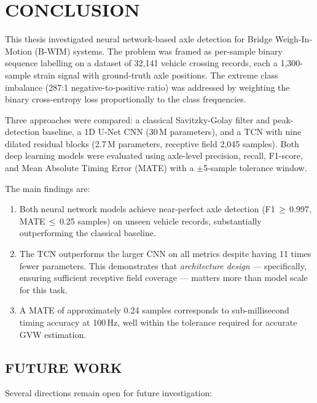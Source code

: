 \chapter{CONCLUSION}

This thesis investigated neural network-based axle detection for Bridge
Weigh-In-Motion (B-WIM) systems. The problem was framed as per-sample binary
sequence labelling on a dataset of 32,141 vehicle crossing records, each a
1,300-sample strain signal with ground-truth axle positions. The extreme class
imbalance (287:1 negative-to-positive ratio) was addressed by weighting the
binary cross-entropy loss proportionally to the class frequencies.

Three approaches were compared: a classical Savitzky-Golay filter and
peak-detection baseline, a 1D U-Net CNN (30\,M parameters), and a TCN with nine
dilated residual blocks (2.7\,M parameters, receptive field 2,045 samples). Both
deep learning models were evaluated using axle-level precision, recall, F1-score,
and Mean Absolute Timing Error (MATE) with a $\pm$5-sample tolerance window.

The main findings are:

\begin{enumerate}
    \item Both neural network models achieve near-perfect axle detection
          (F1\,$\geq$\,0.997, MATE\,$\leq$\,0.25 samples) on unseen vehicle
          records, substantially outperforming the classical baseline.
    \item The TCN outperforms the larger CNN on all metrics despite having 11
          times fewer parameters. This demonstrates that \emph{architecture
          design} --- specifically, ensuring sufficient receptive field coverage
          --- matters more than model scale for this task.
    \item A MATE of approximately 0.24 samples corresponds to sub-millisecond
          timing accuracy at 100\,Hz, well within the tolerance required for
          accurate GVW estimation.
\end{enumerate}

\section{FUTURE WORK}

Several directions remain open for future investigation:

